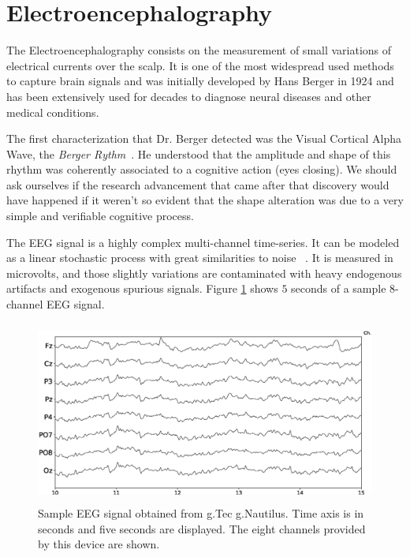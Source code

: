 \documentclass[brainsci,article,submit,moreauthors,pdftex,10pt,a4paper]{mdpi}
\begin{document}
\section{Electroencephalography}
\label{EEG}

The Electroencephalography consists on the measurement of small variations of electrical currents over the scalp.  It is one of the most widespread used methods to capture brain signals and was initially developed by Hans Berger in 1924 and has been extensively used for decades to diagnose neural diseases and other medical conditions.

The first characterization that Dr. Berger detected was the Visual Cortical Alpha Wave, the \textit{Berger Rythm}~\citep{Jansen1991}.  He understood that the amplitude and shape of this rhythm was coherently associated to a cognitive action (eyes closing).  
We should ask ourselves if the research advancement that came after that discovery would have happened if it weren't so evident that the shape alteration was due to a very simple and verifiable cognitive process.

The EEG signal is a highly complex multi-channel time-series.  It can be modeled as a linear stochastic process with great similarities to noise ~\citep{Thakor2004}.  It is measured in microvolts, and those slightly variations are contaminated with heavy endogenous artifacts and exogenous spurious signals.  Figure \ref{fig:sampleeeg} shows $5$ seconds of a sample 8-channel EEG signal.
 
\begin{figure}[H]
\centering
\includegraphics[height=6cm,width=12cm]{images/sampleeeg.eps}
\caption{Sample EEG signal obtained from g.Tec g.Nautilus.  Time axis is in seconds and five seconds are displayed.  The eight channels provided by this device are shown.}
\label{fig:sampleeeg}
\end{figure}

\end{document}
